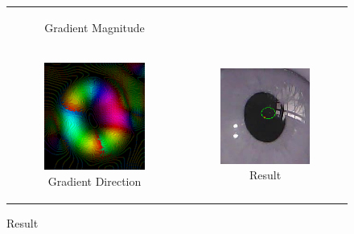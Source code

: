 \begin{figure}[h]
\begin{tabular}{cc}
\begin{subfigure}{0.3\textwidth}
            \caption{Gradient Magnitude}
        \end{subfigure} \\
        \begin{subfigure}{0.3\textwidth}
            \centering
            \includegraphics[width=0.9\linewidth]{plots/eye_dataset/direction.png}
            \caption{Gradient Direction}
        \end{subfigure}   &
        \begin{subfigure}{0.3\textwidth}
            \centering
            \includegraphics[width=0.9\linewidth]{plots/eye_dataset/result.png}
            \caption{Result}
        \end{subfigure}


\end{tabular}
\end{figure}
